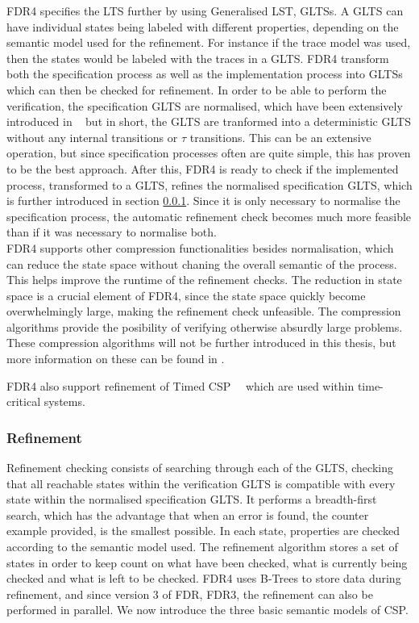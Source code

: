 
FDR4 specifies the LTS further by using Generalised LST, GLTSs. A GLTS can have individual states being labeled with different properties, depending on the semantic model used for the refinement. For instance if the trace model was used, then the states would be labeled with the traces in a GLTS.
FDR4 transform both the specification process as well as the implementation process into GLTSs which can then be checked for refinement. In order to be able to perform the verification, the specification GLTS are normalised, which have been extensively introduced in ~\cite{Roscoe1997} but in short, the GLTS are tranformed into a deterministic GLTS without any internal transitions or $\tau$ transitions. This can be an extensive operation, but since specification processes often are quite simple, this has proven to be the best approach.
After this, FDR4 is ready to check if the implemented process, transformed to a GLTS, refines the normalised specification GLTS, which is further introduced in section \ref{sec:refinement}. Since it is only necessary to normalise the specification process, the automatic refinement check becomes much more feasible than if it was necessary to normalise both. \\

FDR4 supports other compression functionalities besides normalisation, which can reduce the state space without chaning the overall semantic of the process. This helps improve the runtime of the refinement checks. The reduction in state space is a crucial element of FDR4, since the state space quickly become overwhelmingly large, making the refinement check unfeasible. The compression algorithms provide the posibility of verifying otherwise absurdly large problems.
These compression algorithms will not be further introduced in this thesis, but more information on these can be found in \cite{Roscoe2010}.

FDR4 also support refinement of Timed CSP~\cite{REED1988249}~\cite{Armstrong2011} which are used within time-critical systems. \\

\subsubsection{Refinement}
\label{sec:refinement}
Refinement checking consists of searching through each of the GLTS, checking that all reachable states within the verification GLTS is compatible with every state within the normalised specification GLTS. It performs a breadth-first search, which has the advantage that when an error is found, the counter example provided, is the smallest possible. In each state, properties are checked according to the semantic model used. The refinement algorithm stores a set of states in order to keep count on what have been checked, what is currently being checked and what is left to be checked. FDR4 uses B-Trees to store data during refinement, and since version 3 of FDR, FDR3, the refinement can also be performed in parallel.
We now introduce the three basic semantic models of CSP.
